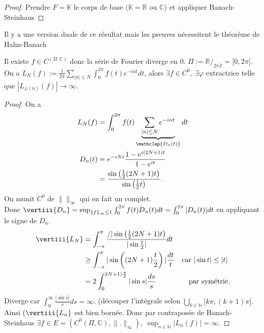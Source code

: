 \begin{proof}
    Prendre $F=\mathbb{K}$ le corps de base $(\mathbb{K}=\mathbb{R} $ ou $\mathbb{C}$) et appliquer Banach-Steinhaus
\end{proof}
\begin{remarque}
    Il y a une version duale de ce résultat mais les preuves nécessitent le théorème de Hahn-Banach
\end{remarque}
\begin{ex}
    Il existe $f\in C^ (\Pi,\mathbb{C})$ donc la série de Fourier diverge en 0. $\Pi:=\mathbb{R} /_{2\pi\mathbb{Z} }=[0,2\pi[$. On a $L_N(f):=\frac{1}{2\pi}\sum\limits_{|n|\le N}^{} \int_0^{2\pi}f(t)e^{-int}dt$, alors $\exists f\in C^0,\ \exists \varphi $ extractrice telle que $|L_{\varphi (n)}(f)|\to \infty $.
\end{ex}
\begin{proof}
    On a
     \begin{align*}
         L_N(f)&=\int_0^{2\pi}f(t)\underbrace{\sum\limits_{|n|\le N}^{} e^{-i nt}}_{\mathclap{D_n(t)}}dt\\
         D_n(t)&=e^{-i Nt}\frac{1-e^{i(2N+1)t}}{1-e^{it}}\\
               &=\frac{\sin \left( \frac{1}{2}(2N+1)t \right) }{\sin\left( \frac{1}{2}t \right) }
     .\end{align*}
     On munit $C^0$ de $\|\|_\infty $ qui en fait un complet. \\
     Donc $\vertiii{D_n}=\sup_{\|f\|_\infty \le 1}\int_0^{2\pi}f(t)D_n(t)dt=\int_0^{2\pi}|D_n(t)|dt$ en appliquant le signe de $D_n$.\\
      \begin{align*}
          \vertiii{L_N}&=\int_{-\pi}^\pi\frac{/|\sin\left( \frac{1}{2}(2N+1)t \right) }{|\sin \frac{t}{2}|}dt\\
                       &\ge \int_{-\pi}^\pi |\sin\left((2N+1)\frac{t}{2}\right)|\frac{dt}{t} &\text{car $|\sin t|\le |t|$ }\\
                       &= 2\int_0^{2N+1)\frac{\pi}{2}}|\sin s|\frac{ds}{s} &\text{par symétrie}
     .\end{align*}
     Diverge car $\int _0^\infty \frac{|\sin s|}{s}ds=\infty .$ (découper l'intégrale selon $\bigcup\limits_{k\in \mathbb{N} } [k\pi,(k+1)\pi[.$ \\
     Ainsi $(\vertiii{L_n}$ est bien bornée. Donc par contraposée de Banach-Steinhaus $\exists f\in E=(C^0(\Pi,\mathbb{C}),\|.\|_\infty ),\ \sup_{n\in \mathbb{N} }|L_n(f)|=\infty .$
\end{proof}

